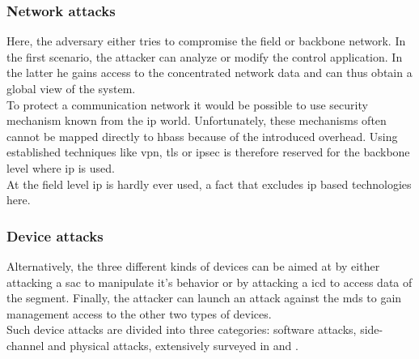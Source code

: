 \subsubsection{Network attacks}
Here, the adversary either tries to compromise the field or backbone network. In the first scenario, the attacker can analyze or modify the control application. In the latter he
gains access to the concentrated network data and can thus obtain a global view of the system.
\\
To protect a communication network it would be possible to use security mechanism known from the \gls{ip} world. 
Unfortunately, these mechanisms often cannot be mapped directly to \glspl{hbas} because of the introduced overhead. Using
established techniques like \gls{vpn}, \gls{tls} or \gls{ipsec} is therefore reserved for the backbone level where \gls{ip} is used.
\\
At the field level \gls{ip} is hardly ever used, a fact that excludes \gls{ip} based technologies here.

\subsubsection{Device attacks}
Alternatively, the three different kinds of devices can be aimed at by either attacking a \gls{sac} to manipulate it's behavior or by attacking a \gls{icd} to access data of the segment.
Finally, the attacker can launch an attack against the \glspl{md} to gain management access to the other two types of devices.
\\
Such device attacks are divided into three categories: software attacks, side-channel and physical attacks, extensively surveyed in \cite{5332331} and \cite{secAn}.